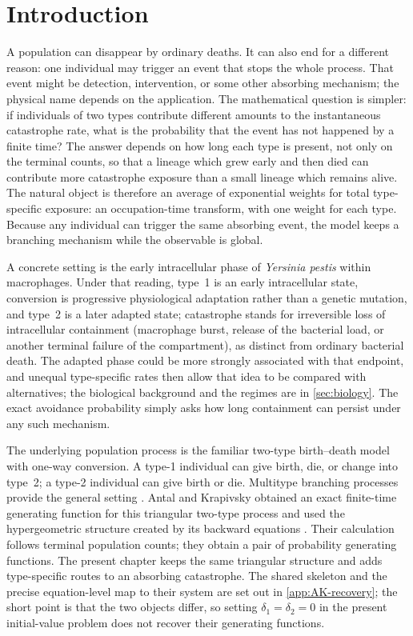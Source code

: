 \section{Introduction}
\label{sec:introduction}

A population can disappear by ordinary deaths. It can also end for a different reason: one individual may trigger an event that stops the whole process. That event might be detection, intervention, or some other absorbing mechanism; the physical name depends on the application. The mathematical question is simpler: if individuals of two types contribute different amounts to the instantaneous catastrophe rate, what is the probability that the event has not happened by a finite time? The answer depends on how long each type is present, not only on the terminal counts, so that a lineage which grew early and then died can contribute more catastrophe exposure than a small lineage which remains alive. The natural object is therefore an average of exponential weights for total type-specific exposure: an occupation-time transform, with one weight for each type. Because any individual can trigger the same absorbing event, the model keeps a branching mechanism while the observable is global.

A concrete setting is the early intracellular phase of \textit{Yersinia pestis} within macrophages. Under that reading, type~1 is an early intracellular state, conversion is progressive physiological adaptation rather than a genetic mutation, and type~2 is a later adapted state; catastrophe stands for irreversible loss of intracellular containment (macrophage burst, release of the bacterial load, or another terminal failure of the compartment), as distinct from ordinary bacterial death. The adapted phase could be more strongly associated with that endpoint, and unequal type-specific rates then allow that idea to be compared with alternatives; the biological background and the regimes are in \cref{sec:biology}. The exact avoidance probability simply asks how long containment can persist under any such mechanism.

The underlying population process is the familiar two-type birth--death model with one-way conversion. A type-1 individual can give birth, die, or change into type~2; a type-2 individual can give birth or die. Multitype branching processes provide the general setting \cite{AthreyaNey1972}. Antal and Krapivsky obtained an exact finite-time generating function for this triangular two-type process and used the hypergeometric structure created by its backward equations \cite{AntalKrapivsky2011}. Their calculation follows terminal population counts; they obtain a pair of probability generating functions. The present chapter keeps the same triangular structure and adds type-specific routes to an absorbing catastrophe. The shared skeleton and the precise equation-level map to their system are set out in \cref{app:AK-recovery}; the short point is that the two objects differ, so setting $\delta_1=\delta_2=0$ in the present initial-value problem does not recover their generating functions. 

